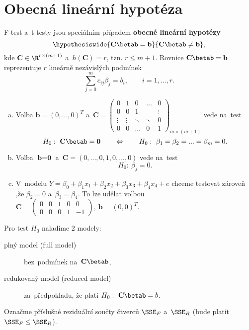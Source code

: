\section{Obecná lineární hypotéza}
F-test a~t-testy jsou speciálním případem \textbf{obecné lineární hypotézy}
$$ \hypothesiswide{\textbf{C}\betab=\textbf{b}}{\textbf{C}\betab\neq\textbf{b}},$$
kde $\textbf{C}\in\R^{r\times(m+1)}$ a~$h(\textbf{C})=r$, tzn. $r\leq m+1$. Rovnice $\textbf{C}\betab=\textbf{b}$ reprezentuje $r$ lineárně nezávislých podmínek 
$$ \sum_{j=0}^m c_{ij}\beta_j=b_i,\qquad i=1,...,r.$$
\begin{remark}
	\begin{enumerate}[a)]
		\item Volba $\textbf{b}=(0,...,0)^T$ a~$\textbf{C}=\left(\begin{array}{c|cccc}
		0 & 1 & 0 & \dots & 0 \\\hline
		0 & 0 & 1 &  & \vdots \\
		\vdots& \vdots & \ddots & \ddots & 0 \\
		0 & 0 & \dots & 0 & 1
		\end{array}
		\right)_{m\times(m+1)}$ vede na~test 
		$$ H_0:~\textbf{C}\betab=\textbf{0}\qquad\Leftrightarrow\qquad H_0:~\beta_1=\beta_2=...=\beta_m=0.$$
		\item Volba $\textbf{b}=\textbf{0}$ a~$\textbf{C}=(0,...,0,1,0,...,0)$ vede na~test 
		$$ H_0:~\beta_j=0.$$
		\item V~modelu $Y=\beta_0+\beta_1x_1+\beta_2x_2+\beta_3x_3+\beta_4x_4+e$ chceme testovat zároveň ,že $\beta_2=0$ a~$\beta_3=\beta_4$. To lze udělat volbou $\textbf{C}=\left(\begin{array}{ccccc}
		0 & 0 & 1 & 0 & 0 \\
		0 & 0 & 0 & 1 & -1
		\end{array}
		 \right),~\textbf{b}=(0,0)^T$.
	\end{enumerate}
\end{remark} 

Pro test $H_0$ naladíme 2 modely:\begin{description}
\item[plný model (full model)] bez~podmínek na~$\textbf{C}\betab$,
\item[redukovaný model (reduced model)] za~předpokladu, že platí $H_0:~\textbf{C}\betab=b$. 
\end{description}

Označme příslušné reziduální součty čtverců $\SSE_F$ a~$\SSE_R$ (bude platit $\SSE_F\leq\SSE_R$).

